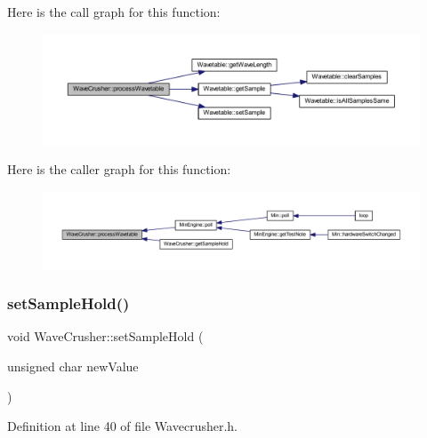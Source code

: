Here is the call graph for this function\+:
\nopagebreak
\begin{figure}[H]
\begin{center}
\leavevmode
\includegraphics[width=350pt]{df/d70/class_wave_crusher_a906f0056db9847e6fafd406ab9e613a9_cgraph}
\end{center}
\end{figure}
Here is the caller graph for this function\+:
\nopagebreak
\begin{figure}[H]
\begin{center}
\leavevmode
\includegraphics[width=350pt]{df/d70/class_wave_crusher_a906f0056db9847e6fafd406ab9e613a9_icgraph}
\end{center}
\end{figure}
\mbox{\label{class_wave_crusher_aa3df1e5da9635cf84a59e4d481bf208b}} 
\subsubsection{\texorpdfstring{set\+Sample\+Hold()}{setSampleHold()}}
{\footnotesize\ttfamily void Wave\+Crusher\+::set\+Sample\+Hold (\begin{DoxyParamCaption}\item[{unsigned char}]{new\+Value }\end{DoxyParamCaption})\hspace{0.3cm}{\ttfamily [inline]}}



Definition at line 40 of file Wavecrusher.\+h.

\mbox{\label{class_wave_crusher_a94b87729fc0b2930b98e8c5fb9ed2631}} 
